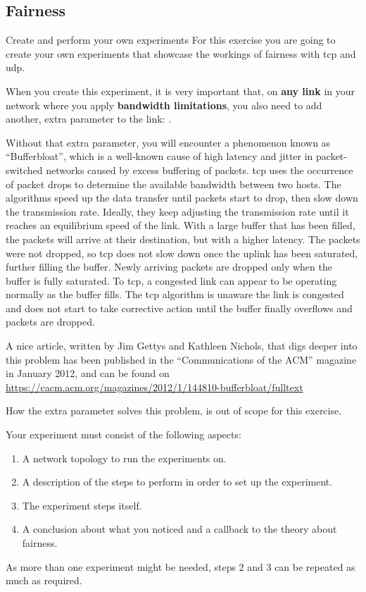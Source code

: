 \subsection{Fairness}
\begin{exercise}{Create and perform your own experiments}
For this exercise you are going to create your own experiments that showcase the workings of fairness with \ac{tcp} and \ac{udp}.

\remark When you create this experiment, it is very important that, on \textbf{any link} in your network where you apply \textbf{bandwidth limitations}, you also need to add another, extra parameter to the link: .

Without that extra parameter, you will encounter a phenomenon known as ``Bufferbloat'', which is a well-known cause of high latency and jitter in packet-switched networks caused by excess buffering of packets. \ac{tcp} uses the occurrence of packet drops to determine the available bandwidth between two hosts. The algorithms speed up the data transfer until packets start to drop, then slow down the transmission rate. Ideally, they keep adjusting the transmission rate until it reaches an equilibrium speed of the link. With a large buffer that has been filled, the packets will arrive at their destination, but with a higher latency. The packets were not dropped, so \ac{tcp} does not slow down once the uplink has been saturated, further filling the buffer. Newly arriving packets are dropped only when the buffer is fully saturated. To \ac{tcp}, a congested link can appear to be operating normally as the buffer fills. The \ac{tcp} algorithm is unaware the link is congested and does not start to take corrective action until the buffer finally overflows and packets are dropped.

A nice article, written by Jim Gettys and Kathleen Nichols, that digs deeper into this problem has been published in the ``Communications of the ACM'' magazine in January 2012, and can be found on \url{https://cacm.acm.org/magazines/2012/1/144810-bufferbloat/fulltext}

How the extra  parameter solves this problem, is out of scope for this exercise.


Your experiment must consist of the following aspects:
\begin{enumerate}
	\item A network topology to run the experiments on.
	\item A description of the steps to perform in order to set up the experiment.
	\item The experiment steps itself.
	\item A conclusion about what you noticed and a callback to the theory about fairness.
\end{enumerate}
As more than one experiment might be needed, steps 2 and 3 can be repeated as much as required.



\end{exercise}
